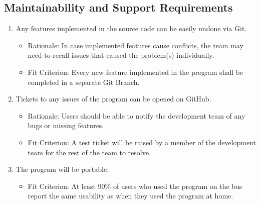 \documentclass[12pt, titlepage]{article}
\begin{document}
\subsection{Maintainability and Support Requirements}
\begin{enumerate}[{MS}1. ]
\item \label{MS1} Any features implemented in the source code can be easily undone via Git.
    \begin{itemize} 
        \item Rationale: In case implemented features cause conflicts, the team may need to recall issues that caused the problem(s) individually.
        \item Fit Criterion: Every new feature implemented in the program shall be completed in a separate Git Branch.
    \end{itemize}
\item \label{MS2} Tickets to any issues of the program can be opened on GitHub.
    \begin{itemize} 
        \item Rationale: Users should be able to notify the development team of any bugs or missing features.
        \item Fit Criterion: A test ticket will be raised by a member of the development team for the rest of the team to resolve.
    \end{itemize}
\item \label{MS3} The program will be portable.
    \begin{itemize} 
        \item Fit Criterion: At least 90\% of users who used the program on the bus report the same usability as when they used the program at home.
    \end{itemize}
\end{enumerate}
\end{document}
